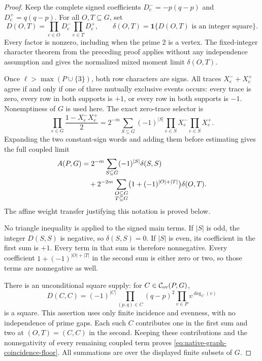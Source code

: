 \documentclass[11pt]{article}
\newcommand{\T}{\mathbf T}
\begin{document}
\begin{proof}
Keep the complete signed coefficients \(D^-_e=-p(q-p)\) and
\(D^+_e=q(q-p)\).
For all \(O,T\subseteq G\), set
\[
 D(O,T)=\prod_{e\in O}D^-_e\prod_{e\in T}D^+_e,\qquad
 \delta(O,T)=\mathbf1\{D(O,T)\text{ is an integer square}\}.
\]
Every factor is nonzero, including when the prime \(2\) is a vertex.
The fixed-integer character theorem from the preceding proof applies
without any independence assumption and gives the normalized mixed
moment limit \(\delta(O,T)\).

Once \(\ell>\max(P\cup\{3\})\), both row characters are signs.
All traces \(X^-_e+X^+_e\) agree if and only if one of three
mutually exclusive events occurs: every trace is zero, every row in
both supports is \(+1\), or every row in both supports is \(-1\).
Nonemptiness of \(G\) is used here. The exact zero-trace selector is
\[
 \prod_{e\in G}\frac{1-X^-_eX^+_e}{2}
 =2^{-m}\sum_{S\subseteq G}(-1)^{|S|}
       \prod_{e\in S}X^-_e\prod_{e\in S}X^+_e.
\]
Expanding the two constant-sign words and adding them before estimating
gives the full coupled limit
\begin{align}
 A(P,G)
 &=2^{-m}\sum_{S\subseteq G}(-1)^{|S|}\delta(S,S)\notag\\
 &\quad+2^{-2m}\sum_{\substack{O\subseteq G\\T\subseteq G}}
       \bigl(1+(-1)^{|O|+|T|}\bigr)\delta(O,T).
 \label{eq:native-graph-full-signed-consumer}
\end{align}
The affine weight transfer justifying this notation is proved below.

No triangle inequality is applied to the signed main terms.
If \(|S|\) is odd, the integer \(D(S,S)\) is negative, so
\(\delta(S,S)=0\). If \(|S|\) is even, its coefficient in the
first sum is \(+1\). Every term in that sum is therefore nonnegative.
Every coefficient \(1+(-1)^{|O|+|T|}\) in the second sum is
either zero or two, so those terms are nonnegative as well.

There is an unconditional square supply: for
\(C\in\mathcal C_{\rm ev}(P,G)\),
\[
 D(C,C)=(-1)^{|C|}
       \prod_{(p,q)\in C}(q-p)^2\prod_{v\in P}v^{\deg_C(v)}
\]
is a square. This assertion uses only finite incidence and evenness,
with no independence of prime gaps.
Each such \(C\) contributes one in the first sum and two at
\((O,T)=(C,C)\) in the second. Keeping these contributions and
the nonnegativity of every remaining coupled term proves
\eqref{eq:native-graph-coincidence-floor}.
All summations are over the displayed finite subsets of \(G\).


\end{proof}
\end{document}
